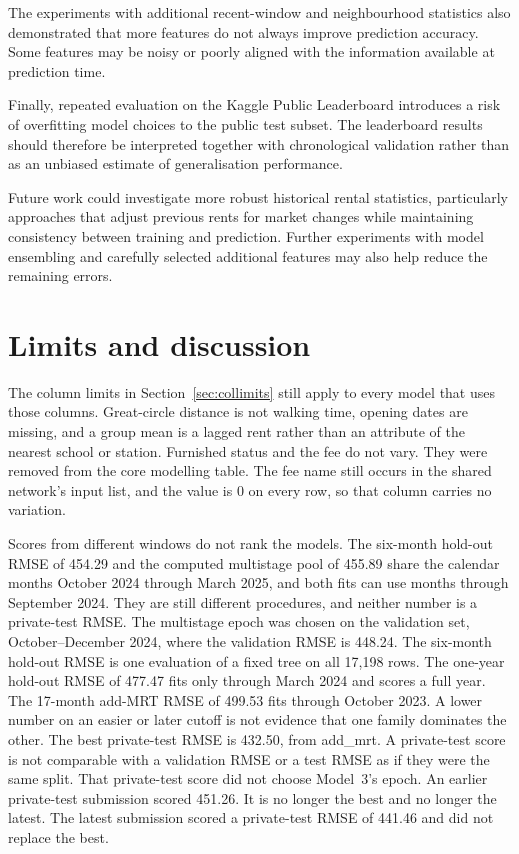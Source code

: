 \documentclass[11pt,a4paper]{article}
\begin{document}
The experiments with additional recent-window and neighbourhood statistics also demonstrated that more features do not always improve prediction accuracy. Some features may be noisy or poorly aligned with the information available at prediction time.

Finally, repeated evaluation on the Kaggle Public Leaderboard introduces a risk of overfitting model choices to the public test subset. The leaderboard results should therefore be interpreted together with chronological validation rather than as an unbiased estimate of generalisation performance.

Future work could investigate more robust historical rental statistics, particularly approaches that adjust previous rents for market changes while maintaining consistency between training and prediction. Further experiments with model ensembling and carefully selected additional features may also help reduce the remaining errors.

\FloatBarrier
\section{Limits and discussion}
\label{sec:limits}

The column limits in Section~\ref{sec:collimits} still apply to every model that uses those columns.
Great-circle distance is not walking time, opening dates are missing, and a group mean is a lagged rent rather than an attribute of the nearest school or station.
Furnished status and the fee do not vary.
They were removed from the core modelling table.
The fee name still occurs in the shared network's input list, and the value is 0 on every row, so that column carries no variation.

Scores from different windows do not rank the models.
The six-month hold-out RMSE of 454.29 and the computed multistage pool of 455.89 share the calendar months October 2024 through March 2025, and both fits can use months through September 2024.
They are still different procedures, and neither number is a private-test RMSE.
The multistage epoch was chosen on the validation set, October--December 2024, where the validation RMSE is 448.24.
The six-month hold-out RMSE is one evaluation of a fixed tree on all 17{,}198 rows.
The one-year hold-out RMSE of 477.47 fits only through March 2024 and scores a full year.
The 17-month add-MRT RMSE of 499.53 fits through October 2023.
A lower number on an easier or later cutoff is not evidence that one family dominates the other.
The best private-test RMSE is 432.50, from add\_mrt.
A private-test score is not comparable with a validation RMSE or a test RMSE as if they were the same split.
That private-test score did not choose Model~3's epoch.
An earlier private-test submission scored 451.26.
It is no longer the best and no longer the latest.
The latest submission scored a private-test RMSE of 441.46 and did not replace the best.
\end{document}
